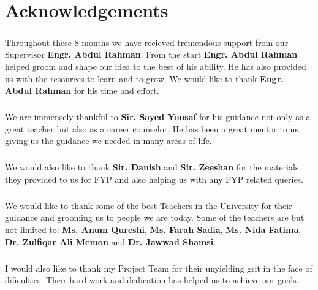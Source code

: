 \chapter*{Acknowledgements}

    \paragraph*{}
        Throughout these 8 months we have recieved tremendous support from our Supervisor \textbf{Engr. Abdul Rahman}.
        From the start \textbf{Engr. Abdul Rahman} helped groom and shape our idea to the best of his ability.
        He has also provided us with the resources to learn and to grow. We would like to thank \textbf{Engr. Abdul Rahman} for his time and effort.
    
    \paragraph*{}
        We are immensely thankful to \textbf{Sir. Sayed Yousaf} for his guidance not only as a great teacher but also as a career counselor. He has been a great mentor to us, giving us the guidance we needed in many areas of life.
        
    \paragraph*{}
        We would also like to thank \textbf{Sir. Danish} and \textbf{Sir. Zeeshan} for the materials they provided to us for FYP and also helping us with any FYP related queries. 

    
    \paragraph*{}
        We would like to thank some of the best Teachers in the University for their guidance and grooming us to people we are today. Some of the teachers are but not limited to: \textbf{Ms. Anum Qureshi}, \textbf{Ms. Farah Sadia}, \textbf{Ms. Nida Fatima}, \textbf{Dr. Zulfiqar Ali Memon} and \textbf{Dr. Jawwad Shamsi}.
    
    \paragraph*{}
        I would also like to thank my Project Team for their unyielding grit in the face of dificulties. Their hard work and dedication has helped us to achieve our goals.

        
